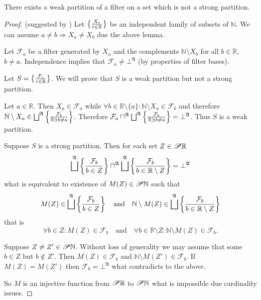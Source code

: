 \begin{example}
There exists a weak partition of a filter on a set which is not a
strong partition.\end{example}
\begin{proof}
(suggested by ) Let $\left\{ \frac{X_{r}}{r\in\mathbb{R}}\right\}$ be
an independent family of subsets of $\mathbb{N}$. We can assume $a\ne b\Rightarrow X_{a}\ne X_{b}$
due the above lemma.

Let $\mathcal{F}_{a}$ be a filter generated by $X_{a}$ and the complements
$\mathbb{N}\setminus X_{b}$ for all $b\in\mathbb{R}$, $b\ne a$.
Independence implies that $\mathcal{F}_{a}\ne\bot^{\mathfrak{A}}$
(by properties of filter bases).

Let $S=\left\{ \frac{\mathcal{F}_{r}}{r\in\mathbb{R}}\right\}$. We will prove
that $S$ is a weak partition but not a strong partition.

Let $a\in\mathbb{R}$. Then $X_{a}\in\mathcal{F}_{a}$ while $\forall b\in\mathbb{R}\setminus\{a\}:\mathbb{N}\setminus X_{a}\in\mathcal{F}_{b}$
and therefore $\mathbb{N}\setminus X_{a}\in\bigsqcup^{\mathfrak{A}}\setcond{\mathcal{F}_{b}}{\mathbb{R}\ni b\ne a}$.
Therefore $\mathcal{F}_{a}\sqcap^{\mathfrak{A}}\bigsqcup^{\mathfrak{A}}\setcond{\mathcal{F}_{b}}{\mathbb{R}\ni b\ne a}=\bot^{\mathfrak{A}}$.
Thus $S$ is a weak partition.

Suppose $S$ is a strong partition. Then for each set $Z\in\mathscr{P}\mathbb{R}$
\[
\bigsqcup^{\mathfrak{A}}\setcond{\mathcal{F}_{b}}{b\in Z}\sqcap^{\mathfrak{A}}\bigsqcup^{\mathfrak{A}}\setcond{\mathcal{F}_{b}}{b\in\mathbb{R}\setminus Z}=\bot^{\mathfrak{A}}
\]
what is equivalent to existence of $M(Z)\in\mathscr{P}\mathbb{N}$ such
that
\[
M(Z)\in\bigsqcup^{\mathfrak{A}}\setcond{\mathcal{F}_{b}}{b\in Z}\quad\text{and}\quad\mathbb{N}\setminus M(Z)\in\bigsqcup^{\mathfrak{A}}\setcond{\mathcal{F}_{b}}{b\in\mathbb{R}\setminus Z}
\]
that is
\[
\forall b\in Z:M(Z)\in\mathcal{F}_{b}\quad\text{and}\quad\forall b\in\mathbb{R}\setminus Z:\mathbb{N}\setminus M(Z)\in\mathcal{F}_{b}.
\]


Suppose $Z\ne Z'\in\mathscr{P}\mathbb{N}$. Without loss of generality
we may assume that some $b\in Z$ but $b\notin Z'$. Then $M(Z)\in\mathcal{F}_{b}$
and $\mathbb{N}\setminus M(Z')\in\mathcal{F}_{b}$. If $M(Z)=M(Z')$
then $\mathcal{F}_{b}=\bot^{\mathfrak{A}}$ what contradicts to the
above.

So $M$ is an injective function from $\mathscr{P}\mathbb{R}$ to $\mathscr{P}\mathbb{N}$
what is impossible due cardinality issues.\end{proof}
